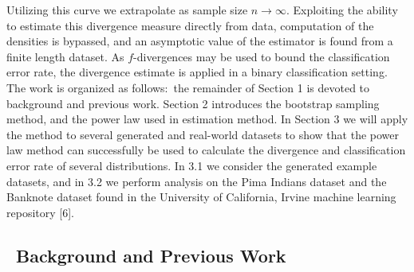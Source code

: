 \documentclass{article}
\begin{document}
 	Utilizing this curve we extrapolate as sample size $n\rightarrow\infty$. Exploiting the ability to estimate this divergence measure directly from data, computation of the densities is bypassed, and an asymptotic value of the estimator is found from a finite length dataset. As $f$-divergences may be used to bound the classification error rate, the divergence estimate is applied in a binary classification setting. 
 	\\ [0.5ex]
 	\indent	The work is organized as follows:\ the remainder of Section 1 is devoted to background and previous work. Section 2 introduces the bootstrap sampling method, and the power law used in estimation method. In Section 3 we will apply the method to several generated and real-world datasets to show that the power law method can successfully be used to calculate the divergence and classification error rate of several distributions. In 3.1 we consider the generated example datasets, and in 3.2 we perform analysis on the Pima Indians dataset and the Banknote dataset found in the University of California, Irvine machine learning repository [6].
	\subsection*{\ Background and Previous Work}	
\end{document}
